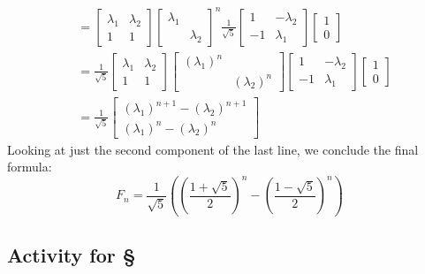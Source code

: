 \documentclass[11pt,oneside]{amsbook}
\theoremstyle{definition}
\theoremstyle{plain}
\theoremstyle{definition}
\theoremstyle{remark}
\numberwithin{equation}{section}
\numberwithin{figure}{section}
\begin{document}
\begin{itemize}
\begin{align*}
    &=\begin{bmatrix}\lambda_1&\lambda_2\\1&1\end{bmatrix}
      \begin{bmatrix}\lambda_1\\&\lambda_2\end{bmatrix}^n
      \frac{1}{\sqrt{5}}
      \begin{bmatrix}1&-\lambda_2\\
        -1&\lambda_1\end{bmatrix}
      \begin{bmatrix}1\\0\end{bmatrix}\\
    &=\frac{1}{\sqrt{5}}
      \begin{bmatrix}\lambda_1&
        \lambda_2\\1&1\end{bmatrix}
      \begin{bmatrix}(\lambda_1)^n\\
        &(\lambda_2)^n\end{bmatrix}
      \begin{bmatrix}1&-\lambda_2\\
        -1&\lambda_1\end{bmatrix}
      \begin{bmatrix}1\\0\end{bmatrix}\\
    &=\frac{1}{\sqrt{5}}
      \begin{bmatrix}
        (\lambda_1)^{n+1}-(\lambda_2)^{n+1}\\
        (\lambda_1)^n-(\lambda_2)^n
      \end{bmatrix}
  \end{align*}
  Looking at just the second component of the last line, we conclude the final formula:
  \[F_n=\frac{1}{\sqrt{5}}
    \left(\left(\frac{1+\sqrt{5}}{2}\right)^n
    -\left(\frac{1-\sqrt{5}}{2}\right)^n\right)
  \]
\end{itemize}


\newpage
\subsection*{Activity for \S \thesection}
\end{document}

